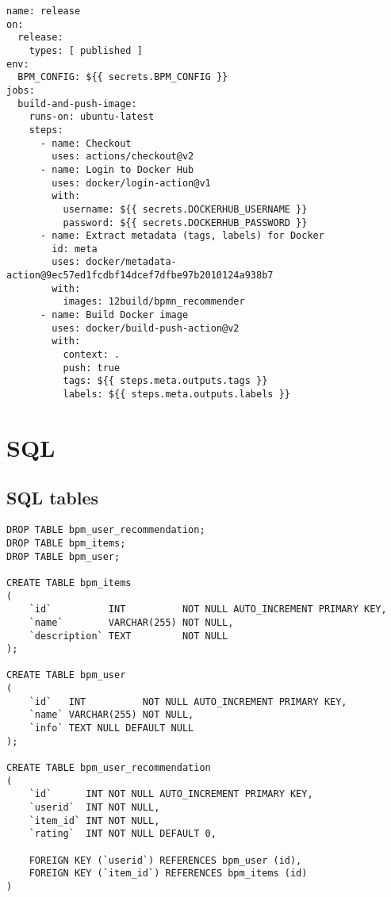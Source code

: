 \begin{verbatim}
name: release
on:
  release:
    types: [ published ]
env:
  BPM_CONFIG: ${{ secrets.BPM_CONFIG }}
jobs:
  build-and-push-image:
    runs-on: ubuntu-latest
    steps:
      - name: Checkout
        uses: actions/checkout@v2
      - name: Login to Docker Hub
        uses: docker/login-action@v1
        with:
          username: ${{ secrets.DOCKERHUB_USERNAME }}
          password: ${{ secrets.DOCKERHUB_PASSWORD }}
      - name: Extract metadata (tags, labels) for Docker
        id: meta
        uses: docker/metadata-action@9ec57ed1fcdbf14dcef7dfbe97b2010124a938b7
        with:
          images: 12build/bpmn_recommender
      - name: Build Docker image
        uses: docker/build-push-action@v2
        with:
          context: .
          push: true
          tags: ${{ steps.meta.outputs.tags }}
          labels: ${{ steps.meta.outputs.labels }}
\end{verbatim}
\label{code:github_deploy}

\section{SQL}

\subsection{SQL tables}

\begin{verbatim}
DROP TABLE bpm_user_recommendation;
DROP TABLE bpm_items;
DROP TABLE bpm_user;

CREATE TABLE bpm_items
(
    `id`          INT          NOT NULL AUTO_INCREMENT PRIMARY KEY,
    `name`        VARCHAR(255) NOT NULL,
    `description` TEXT         NOT NULL
);

CREATE TABLE bpm_user
(
    `id`   INT          NOT NULL AUTO_INCREMENT PRIMARY KEY,
    `name` VARCHAR(255) NOT NULL,
    `info` TEXT NULL DEFAULT NULL
);

CREATE TABLE bpm_user_recommendation
(
    `id`      INT NOT NULL AUTO_INCREMENT PRIMARY KEY,
    `userid`  INT NOT NULL,
    `item_id` INT NOT NULL,
    `rating`  INT NOT NULL DEFAULT 0,

    FOREIGN KEY (`userid`) REFERENCES bpm_user (id),
    FOREIGN KEY (`item_id`) REFERENCES bpm_items (id)
)
\end{verbatim}
\label{code:sql_tables}